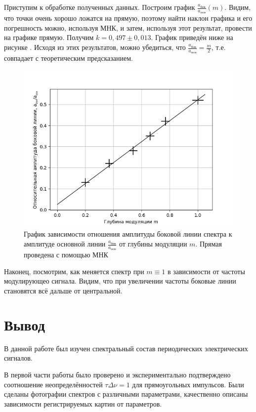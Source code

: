 \documentclass[a4paper,10pt]{article}
\begin{document}
Приступим к обработке полученных данных. Построим график $\frac{a_{\text{бок}}}{a_{\text{осн}}}\left(m\right)$. Видим, что точки очень хорошо ложатся на прямую, поэтому найти наклон графика и его погрешность можно, используя МНК, и затем, используя этот результат, провести на графике прямую. Получим $k=0,497\pm0,013$. График приведён ниже на рисунке . Исходя из этих результатов, можно убедиться, что $\frac{a_{\text{бок}}}{a_{\text{осн}}}=\frac{m}{2}$, т.е. совпадает с теоретическим предсказанием.

\begin{figure}[h]
	\centering
	\includegraphics[scale=0.75]{Plot_C}
	\caption{График зависимости отношения амплитуды боковой линии спектра к амплитуде основной линии $\frac{a_{\text{бок}}}{a_{\text{осн}}}$ от глубины модуляции $m$. Прямая проведена с помощью МНК} \label{Plot_C}
\end{figure}

Наконец, посмотрим, как меняется спектр при $m\equiv1$ в зависимости от частоты модулирующео сигнала. Видим, что при увеличении частоты боковые линии становятся всё дальше от центральной.

\section*{Вывод}

В данной работе был изучен спектральный состав периодических электрических сигналов.

В первой части работы было проверено и экспериментально подтверждено соотношение неопределённостей $\tau\Delta\nu=1$ для прямоугольных импульсов. Были сделаны фотографии спектров с различными параметрами, качественно описаны зависимости регистрируемых картин от параметров.
\end{document}
